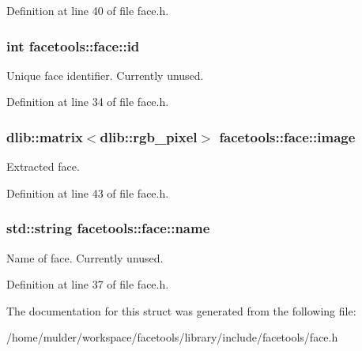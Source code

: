Definition at line 40 of file face.\+h.

\subsubsection[{\texorpdfstring{id}{id}}]{\setlength{\rightskip}{0pt plus 5cm}int facetools\+::face\+::id}\hypertarget{structfacetools_1_1face_a43e0fae69b073d4f18fbdd480ac33294}{}\label{structfacetools_1_1face_a43e0fae69b073d4f18fbdd480ac33294}
Unique face identifier. Currently unused. 

Definition at line 34 of file face.\+h.

\subsubsection[{\texorpdfstring{image}{image}}]{\setlength{\rightskip}{0pt plus 5cm}dlib\+::matrix$<$dlib\+::rgb\+\_\+pixel$>$ facetools\+::face\+::image}\hypertarget{structfacetools_1_1face_a4ea442a55dae5f2866c2955c138becae}{}\label{structfacetools_1_1face_a4ea442a55dae5f2866c2955c138becae}
Extracted face. 

Definition at line 43 of file face.\+h.

\subsubsection[{\texorpdfstring{name}{name}}]{\setlength{\rightskip}{0pt plus 5cm}std\+::string facetools\+::face\+::name}\hypertarget{structfacetools_1_1face_a8e54b836e74d323043b30c459be1607c}{}\label{structfacetools_1_1face_a8e54b836e74d323043b30c459be1607c}
Name of face. Currently unused. 

Definition at line 37 of file face.\+h.



The documentation for this struct was generated from the following file\+:\begin{DoxyCompactItemize}
\item 
/home/mulder/workspace/facetools/library/include/facetools/face.\+h\end{DoxyCompactItemize}
